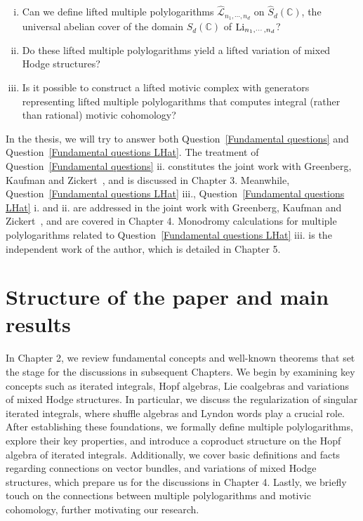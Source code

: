 \begin{question}\label{Fundamental questions LHat}\hfill
\begin{enumerate}[i.]
\item Can we define lifted multiple polylogarithms $\widehat{\mathcal L}_{n_1,\cdots,n_d}$ on $\widehat S_d(\mathbb C)$, the universal abelian cover of the domain $S_d(\mathbb C)$ of $\operatorname{Li}_{n_1,\cdots,n_d}$?
\item Do these lifted multiple polylogarithms yield a lifted variation of mixed Hodge structures?
\item Is it possible to construct a lifted motivic complex with generators representing lifted multiple polylogarithms that computes integral (rather than rational) motivic cohomology?
\end{enumerate}
\end{question}

In the thesis, we will try to answer both Question~\ref{Fundamental questions} and Question~\ref{Fundamental questions LHat}. The treatment of Question~\ref{Fundamental questions} ii. constitutes the joint work with Greenberg, Kaufman and Zickert~\cite{ZDHZ_TheLieCoalgebraOfMultiplePolylogarithms}, and is discussed in Chapter 3. Meanwhile, Question~\ref{Fundamental questions LHat} iii., Question~\ref{Fundamental questions LHat} i. and ii. are addressed in the joint work with Greenberg, Kaufman and Zickert~\cite{ZDHZ_HopfAlgebrasOfMultiplePolylogarithmsAndHolomorphicOneForms}, and are covered in Chapter 4. Monodromy calculations for multiple polylogarithms related to Question~\ref{Fundamental questions LHat} iii. is the independent work of the author, which is detailed in Chapter 5.

\section{Structure of the paper and main results}

In Chapter 2, we review fundamental concepts and well-known theorems that set the stage for the discussions in subsequent Chapters. We begin by examining key concepts such as iterated integrals, Hopf algebras, Lie coalgebras and variations of mixed Hodge structures. In particular, we discuss the regularization of singular iterated integrals, where shuffle algebras and Lyndon words play a crucial role. After establishing these foundations, we formally define multiple polylogarithms, explore their key properties, and introduce a coproduct structure on the Hopf algebra of iterated integrals. Additionally, we cover basic definitions and facts regarding connections on vector bundles, and variations of mixed Hodge structures, which prepare us for the discussions in Chapter 4. Lastly, we briefly touch on the connections between multiple polylogarithms and motivic cohomology, further motivating our research.

